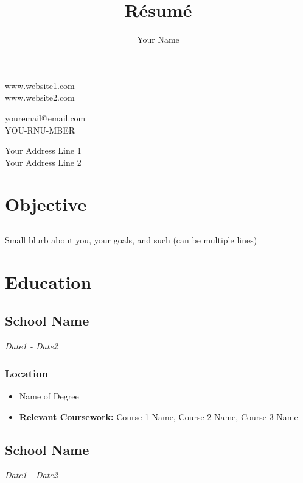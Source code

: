 \documentclass{article}
\renewcommand{\maketitle}[6]{
    \begin{center}
        {\LARGE\bfseries\theauthor}
    \end{center}

    \vspace{-20pt}

    \begin{multicols}{3}
        \begin{flushleft}
            #1 \\
            #2
        \end{flushleft}

        \begin{center}
            #3 \\
            #4
        \end{center}

        \begin{flushright}
            #5 \\
            #6
        \end{flushright}
    \end{multicols}
}
\renewcommand{\date}[1]{
    \hfill{\normalsize\textit{#1}}
}
\newcommand{\relevantcoursework}{
    {\bfseries Relevant Coursework: }
}
\begin{document}
    \title{R\'esum\'e}
    \author{Your Name}

    \maketitle{
        www.website1.com
    }{
        www.website2.com
    }{
        youremail@email.com
    }{
        YOU-RNU-MBER
    }{
        Your Address Line 1
    }{
        Your Address Line 2
    }

    \section{Objective}
        \subsection{}
            Small blurb about you, your goals, and such (can be multiple lines)

    \section{Education}

        \subsection{School Name}\date{Date1 - Date2}
            \subsubsection{Location}
                \begin{itemize}
                    \item Name of Degree
                    \item \relevantcoursework{Course 1 Name, Course 2 Name, Course 3 Name}
                \end{itemize}
        \subsection{School Name}\date{Date1 - Date2}
\end{document}
